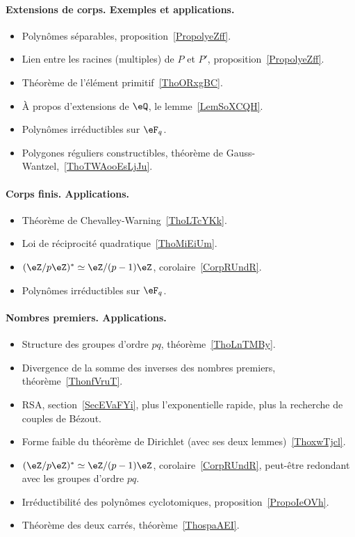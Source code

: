 \paragraph{Extensions de corps. Exemples et applications.}
\begin{itemize}
    \item Polynômes séparables, proposition~\ref{PropolyeZff}.
    \item Lien entre les racines (multiples) de \( P\) et \( P'\), proposition~\ref{PropolyeZff}.
    \item Théorème de l'élément primitif~\ref{ThoORxgBC}.
    \item À propos d'extensions de \( \eQ\), le lemme~\ref{LemSoXCQH}.
    \item Polynômes irréductibles sur \( \eF_q\).
    \item Polygones réguliers constructibles, théorème de Gauss-Wantzel,~\ref{ThoTWAooEsLjJu}.
\end{itemize}
\paragraph{Corps finis. Applications.}
\begin{itemize}
    \item Théorème de Chevalley-Warning~\ref{ThoLTcYKk}.
    \item Loi de réciprocité quadratique~\ref{ThoMiEiUm}.
    \item \( (\eZ/p\eZ)^*\simeq \eZ/(p-1)\eZ\), corolaire~\ref{CorpRUndR}.
    \item Polynômes irréductibles sur \( \eF_q\).
\end{itemize}

\paragraph{Nombres premiers. Applications.}
\begin{itemize}
    \item Structure des groupes d'ordre \( pq\), théorème~\ref{ThoLnTMBy}.
    \item Divergence de la somme des inverses des nombres premiers, théorème~\ref{ThonfVruT}.
    \item RSA, section~\ref{SecEVaFYi}, plus l'exponentielle rapide, plus la recherche de couples de Bézout.
    \item Forme faible du théorème de Dirichlet (avec ses deux lemmes)~\ref{ThoxwTjcl}.
    \item \( (\eZ/p\eZ)^*\simeq \eZ/(p-1)\eZ\), corolaire~\ref{CorpRUndR}, peut-être redondant avec les groupes d'ordre \( pq\).
    \item Irréductibilité des polynômes cyclotomiques, proposition~\ref{PropoIeOVh}.
    \item Théorème des deux carrés, théorème~\ref{ThospaAEI}.
\end{itemize}
